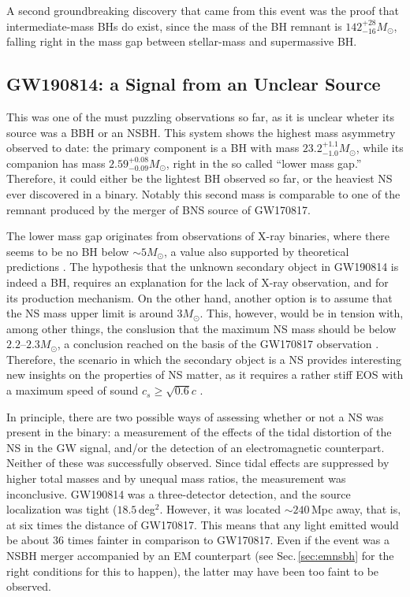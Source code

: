\documentclass[binding=0.6cm, LaM]{sapthesis}
\begin{document}
	A second groundbreaking discovery that came from this event 
	was the proof that intermediate-mass BHs do exist,
	since the mass of the BH remnant is $142^{+28}_{-16}M_\odot$, 
	falling right in the mass gap between stellar-mass and supermassive BH.

\subsection{GW190814: a Signal from an Unclear Source}
	This was one of the must puzzling observations so far, as it is unclear
	wheter its source was a BBH or an NSBH.
	This system shows the highest mass asymmetry observed to date:
	the primary component is a BH with mass $23.2^{+1.1}_{-1.0}M_\odot$, 
	while its companion has mass $2.59^{+0.08}_{-0.09}M_\odot$, right in the so called
	``lower mass gap.''  Therefore, it could either be the lightest BH
	observed so far, or the heaviest NS ever discovered in a binary.
        Notably this second mass is comparable to one of the remnant 
	produced by the merger of BNS source of GW170817.

	The lower mass gap originates from observations of X-ray binaries, 
	where there seems to be no BH below $\sim 5M_\odot$,
	a value also supported by theoretical predictions \cite{195}.
	The hypothesis that the unknown secondary object in GW190814 is indeed a BH, 
	requires an explanation for the lack of X-ray observation, 
	and for its production mechanism.
	On the other hand, another option is to assume that the NS mass upper limit is around $3M_\odot$.
	This, however, would be in tension with, among other things, the conslusion that 
        the maximum NS mass should be below $2.2$--$2.3M_\odot$, 
	a conclusion reached on the basis of the GW170817 observation \cite{197,198}.
	Therefore, the scenario in which the secondary object is a NS provides interesting new insights on the properties of NS matter, 
	as it requires a rather stiff EOS with a maximum speed of sound $c_s \geq \sqrt{0.6}c$ \cite{199}.

	In principle, there are two possible ways of assessing whether or not a NS was present in the binary: 
	a measurement of the effects of the tidal distortion of the NS 
	in the GW signal, and/or the detection of an electromagnetic counterpart.
        Neither of these was successfully observed.
	Since tidal effects are suppressed by higher total masses 	
	and by unequal mass ratios, the measurement was inconclusive. 
	GW190814 was a three-detector detection, and the source localization was tight ($18.5\,$deg$^2$.  
	However, it was located $\sim 240\,$Mpc away, that is,
	at six times the distance of GW170817.  
	This means that any light emitted would be about 36 times fainter in comparison to GW170817.
	Even if the event was a NSBH merger accompanied by an EM counterpart
	(see Sec.\,\ref{sec:emnsbh} for the right conditions for this to happen), 
	the latter may have been too faint to be observed.
\end{document}
